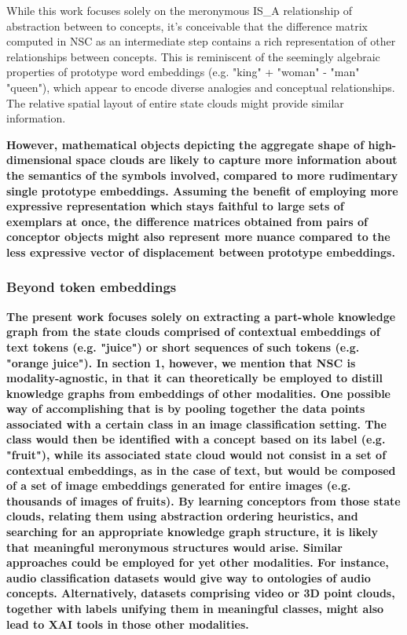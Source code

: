 While this work focuses solely on the meronymous IS\_A relationship of abstraction between to concepts, it's conceivable that the difference matrix computed in NSC as an intermediate step contains a rich representation of other relationships between concepts. This is reminiscent of the seemingly algebraic properties of prototype word embeddings (e.g. "king" + "woman" - "man" ~ "queen"), which appear to encode diverse analogies and conceptual relationships. The relative spatial layout of entire state clouds might provide similar information.

\textbf{However, mathematical objects depicting the aggregate shape of high-dimensional space clouds are likely to capture more information about the semantics of the symbols involved, compared to more rudimentary single prototype embeddings. Assuming the benefit of employing more expressive representation which stays faithful to large sets of exemplars at once, the difference matrices obtained from pairs of conceptor objects might also represent more nuance compared to the less expressive vector of displacement between prototype embeddings.} 

\subsubsection{Beyond token embeddings}

\textbf{The present work focuses solely on extracting a part-whole knowledge graph from the state clouds comprised of contextual embeddings of text tokens (e.g. "juice") or short sequences of such tokens (e.g. "orange juice"). In section 1, however, we mention that NSC is modality-agnostic, in that it can theoretically be employed to distill knowledge graphs from embeddings of other modalities. One possible way of accomplishing that is by pooling together the data points associated with a certain class in an image classification setting. The class would then be identified with a concept based on its label (e.g. "fruit"), while its associated state cloud would not consist in a set of contextual embeddings, as in the case of text, but would be composed of a set of image embeddings generated for entire images (e.g. thousands of images of fruits). By learning conceptors from those state clouds, relating them using abstraction ordering heuristics, and searching for an appropriate knowledge graph structure, it is likely that meaningful meronymous structures would arise. Similar approaches could be employed for yet other modalities. For instance, audio classification datasets would give way to ontologies of audio concepts. Alternatively, datasets comprising video or 3D point clouds, together with labels unifying them in meaningful classes, might also lead to XAI tools in those other modalities.}

